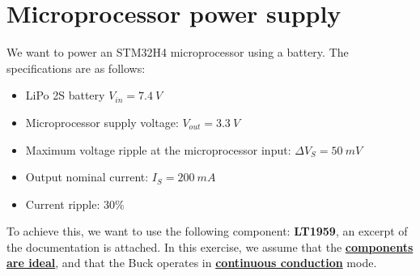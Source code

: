 \chapter{Microprocessor power supply}
We want to power an STM32H4 microprocessor using a battery. The specifications are as follows:

\begin{itemize}
\item LiPo 2S battery $V_{in} = 7.4\ V$
\item Microprocessor supply voltage: $V_{out}=3.3\ V$
\item Maximum voltage ripple at the microprocessor input: $\Delta V_S = 50\ mV$
\item Output nominal current: $I_S = 200\ mA$
\item Current ripple: 30\%
\end{itemize}

To achieve this, we want to use the following component: \textbf{LT1959}, an excerpt of the documentation is attached. In this exercise, we assume that the \underline{\textbf{components are ideal}}, and that the Buck operates in \underline{\textbf{continuous conduction}} mode.


